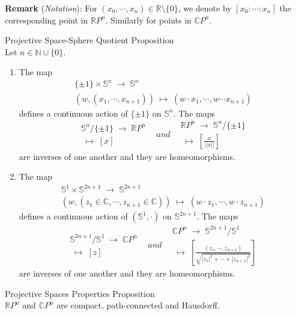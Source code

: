 \noindent\textbf{Remark} (\textit{Notation}): For $(x_0,\cdots,x_n) \in \mathbb{R} \setminus \{0\}$, we denote by $[x_0 :\cdots: x_n]$ the corresponding point in $\mathbb{R}P^n$. Similarly for points in $\mathbb{C}P^n$.

\begin{proposition}{Projective Space-Sphere Quotient Proposition}\\
Let $n \in \mathbb{N} \cup \{0\}$.
\begin{enumerate}
    \item The map
    $$\substack{\{ \pm 1\} \times \mathbb{S}^n \;\to\; \mathbb{S}^n\\
    (w,(x_1, \cdots, x_{n+1})) \;\mapsto\; (w \cdot x_1 ,\cdots, w \cdots x_{n+1})}$$
    defines a continuous action of $\{ \pm1\}$ on $\mathbb{S}^n$. The maps
    $$\substack{\mathbb{S}^n/ \{ \pm1\} \;\to\; \mathbb{R}P^n\\
    [x] \;\mapsto\; [x]} \;\;\;and\;\;\; \substack{\mathbb{R}P^n \;\to\; \mathbb{S}^n/ \{ \pm1\}\\
    [x] \;\mapsto\; [\frac{x}{||x||}]}$$
    are inverses of one another and they are homeomorphisms.

    \item The map 
    $$\substack{\mathbb{S}^1 \times \mathbb{S}^{2n+1} \;\to\; \mathbb{S}^{2n+1}\\
    (w,(z_1 \in \mathbb{C} ,\cdots, z_{n+1} \in \mathbb{C})) \;\mapsto\; (w \cdot z_1 ,\cdots, w \cdot z_{n+1})}$$
    defines a continuous action of $(\mathbb{S}^1,\cdot)$ on $\mathbb{S}^{2n+1}$. The maps
    $$\substack{\mathbb{S}^{2n+1} /\mathbb{S}^1 \;\to\; \mathbb{C}P^n\\
    [z] \;\mapsto\; [z]} \;\;\;and\;\;\; \substack{\mathbb{C}P^n \;\to\; \mathbb{S}^{2n+1}/\mathbb{S}^1\\
    [z_1: \cdots: z_{n+1}] \;\mapsto\; [\frac{(z_1, \cdots, z_{n+1})}{\sqrt{|z_1|^2 + \cdots+ |z_{n+1}|^2}}]}$$
    are inverses of one another and they are homeomorphisms.
\end{enumerate}
\end{proposition}

\begin{proposition}{Projective Spaces Properties Proposition}\\
$\mathbb{R}P^n$ and $\mathbb{C}P^n$ are compact, path-connected and Hausdorff.
\end{proposition}

